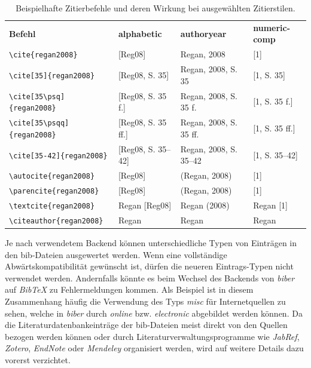 	\begin{table}[!htb]
		\small
		\centering
		\caption{Beispielhafte Zitierbefehle und deren Wirkung bei ausgewählten Zitierstilen.}
		\label{tab:citing}
		\begin{tabular}{llll}
			\toprule
			\textbf{Befehl} & \textbf{alphabetic} & \textbf{authoryear} & \textbf{numeric-comp} \\
			\cmidrule(r){1-1}
			\cmidrule(l){2-4}
			\verb|\cite{regan2008}| & [Reg08] & Regan, 2008 & [1] \\
			\verb|\cite[35]{regan2008}| & [Reg08, S. 35] & Regan, 2008, S. 35 & [1, S. 35] \\
			\verb|\cite[35\psq]{regan2008}| & [Reg08, S. 35 f.] & Regan, 2008, S. 35 f. & [1, S. 35 f.] \\
			\verb|\cite[35\psqq]{regan2008}| & [Reg08, S. 35 ff.] & Regan, 2008, S. 35 ff. & [1, S. 35 ff.] \\
			\verb|\cite[35-42]{regan2008}| & [Reg08, S. 35–42] & Regan, 2008, S. 35–42 & [1, S. 35--42] \\
			\verb|\autocite{regan2008}| & [Reg08] & (Regan, 2008) & [1] \\
			\verb|\parencite{regan2008}| & [Reg08] & (Regan, 2008) & [1] \\
			\verb|\textcite{regan2008}| & Regan [Reg08] & Regan (2008) & Regan [1] \\
			\verb|\citeauthor{regan2008}| & Regan & Regan & Regan \\
			\bottomrule
		\end{tabular}
	\end{table}

	Je nach verwendetem Backend können unterschiedliche Typen von Einträgen in den bib-Dateien ausgewertet werden.
	Wenn eine vollständige Abwärtskompatibilität gewünscht ist, dürfen die neueren Eintrags-Typen nicht verwendet werden.
	Andernfalls könnte es beim Wechsel des Backends von \textit{biber} auf \textit{BibTeX} zu Fehlermeldungen kommen.
	Als Beispiel ist in diesem Zusammenhang häufig die Verwendung des Typs \textit{misc} für Internetquellen zu sehen, welche in \textit{biber} durch \textit{online} bzw. \textit{electronic} abgebildet werden können.
	Da die Literaturdatenbankeinträge der bib-Dateien meist direkt von den Quellen bezogen werden können oder durch Literaturverwaltungsprogramme wie \textit{JabRef}, \textit{Zotero}, \textit{EndNote} oder \textit{Mendeley} organisiert werden, wird auf weitere Details dazu vorerst verzichtet.



